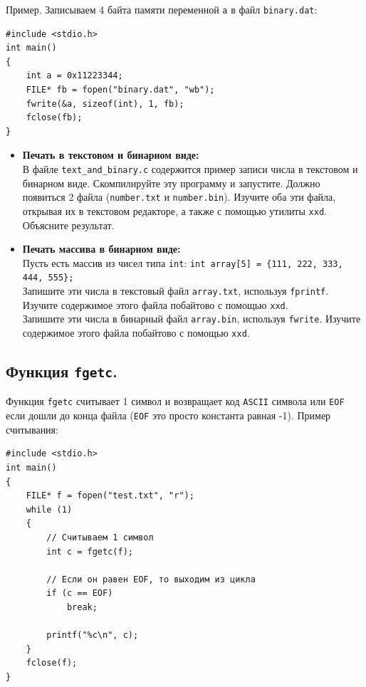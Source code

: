 \documentclass{article}
\begin{document}
Пример. Записываем 4 байта памяти переменной \texttt{a} в файл \texttt{binary.dat}:
\begin{lstlisting}
#include <stdio.h>
int main() 
{
    int a = 0x11223344;
    FILE* fb = fopen("binary.dat", "wb");
    fwrite(&a, sizeof(int), 1, fb);
    fclose(fb);
}
\end{lstlisting}

\begin{itemize}
\item \textbf{Печать в текстовом и бинарном виде:}\\
В файле \texttt{text\_and\_binary.c} содержится пример записи числа в текстовом и бинарном виде. Скомпилируйте эту программу и запустите. Должно появиться 2 файла (\texttt{number.txt} и \texttt{number.bin}). Изучите оба эти файла, открывая их в текстовом редакторе, а также с помощью утилиты \texttt{xxd}. Объясните результат.


\item \textbf{Печать массива в бинарном виде:}\\
Пусть есть массив из чисел типа \texttt{int}: \texttt{int array[5] = \{111, 222, 333, 444, 555\};}\\
Запишите эти числа в текстовый файл \texttt{array.txt}, используя \texttt{fprintf}. Изучите содержимое этого файла побайтово с помощью \texttt{xxd}.\\
Запишите эти числа в бинарный файл \texttt{array.bin}, используя \texttt{fwrite}. Изучите содержимое этого файла побайтово с помощью \texttt{xxd}.
\end{itemize}


\newpage
\subsection*{Функция \texttt{fgetс}.}
Функция \texttt{fgetc} считывает 1 символ и возвращает код \texttt{ASCII} символа или \texttt{EOF} если дошли до конца файла (\texttt{EOF} это просто константа равная -1). Пример считывания:

\begin{lstlisting}
#include <stdio.h>
int main()
{
    FILE* f = fopen("test.txt", "r");
    while (1)
    {
        // Считываем 1 символ
        int c = fgetc(f);
		
        // Если он равен EOF, то выходим из цикла
        if (c == EOF)
            break;
            
        printf("%c\n", c);
	}
    fclose(f);
}
\end{lstlisting}
\end{document}
